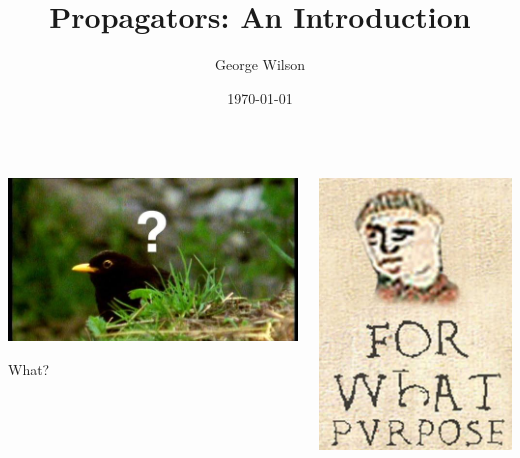 \documentclass[usenames,dvipsnames,svgnames,table,aspectratio=1610,mathserif]{beamer}
\title[Propagators]{Propagators: An Introduction} %
\author{George Wilson} %
\institute[] %
{
Data61/CSIRO\\ %
\medskip
\href{george.wilson@data61.csiro.au}{george.wilson@data61.csiro.au} %
}
\date{\today} %
\newcommand{\nl}{\vspace{\baselineskip}}
\begin{document}


\begin{frame}
\titlepage %
\end{frame}


\begin{frame}

\begin{columns}
  \begin{column}{0.5\textwidth}
    \begin{center}
      \includegraphics[scale=0.015]{what-are-birds.jpg}

      \nl

      What?
    \end{center}
  \end{column}
  \begin{column}{0.5\textwidth}
    \begin{center}
      \includegraphics[scale=0.3]{for-what-purpose.jpg}


\end{center}
\end{column}
\end{columns}
\end{frame}
\end{document}
